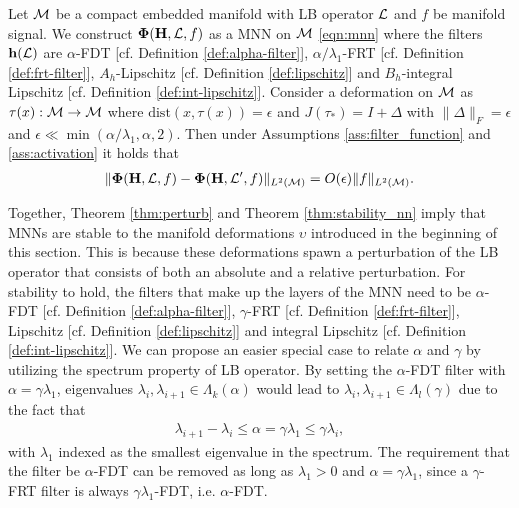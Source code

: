 \begin{theorem}
Let ${\mathcal M}$ be a compact embedded manifold with LB operator ${\mathcal L}$ and $f$ be manifold signal. We construct $\bm\Phi({\mathbf H},{\mathcal L},f)$ as a MNN on ${\mathcal M}$ \eqref{eqn:mnn} where the filters ${\mathbf h}({\mathcal L})$ are $\alpha$-FDT [cf. Definition \ref{def:alpha-filter}], $\alpha/\lambda_1$-FRT [cf. Definition \ref{def:frt-filter}], $A_h$-Lipschitz [cf. Definition \ref{def:lipschitz}] and $B_h$-integral Lipschitz [cf. Definition \ref{def:int-lipschitz}]. Consider a deformation on ${\mathcal M}$ as $\tau(x):{\mathcal M}\rightarrow {\ensuremath{\mathcal M}}$ where $\text{dist}(x,\tau(x))=\epsilon$ and $J(\tau_*)=I+\Delta$ with $\|\Delta\|_F=\epsilon$ and $\epsilon\ll \min(\alpha/\lambda_1,\alpha,2)$. Then under Assumptions \ref{ass:filter_function} and \ref{ass:activation} it holds that
\begin{align}
    \|\bm\Phi({\mathbf H},{\mathcal L},f)-\bm\Phi({\mathbf H},{\mathcal L}',f)\|_{L^2({\mathcal M})}=O(\epsilon)\|f\|_{L^2({\mathcal M})}.
\end{align}
\end{theorem}

Together, Theorem \ref{thm:perturb} and Theorem \ref{thm:stability_nn} imply that MNNs are stable to the manifold deformations $\upsilon$ introduced in the beginning of this section. This is because these deformations spawn a perturbation of the LB operator that consists of both an absolute and a relative perturbation. For stability to hold, the filters that make up the layers of the MNN need to be $\alpha$-FDT [cf. Definition \ref{def:alpha-filter}], $\gamma$-FRT [cf. Definition \ref{def:frt-filter}], Lipschitz [cf. Definition \ref{def:lipschitz}] and integral Lipschitz [cf. Definition \ref{def:int-lipschitz}]. We can propose an easier special case to relate $\alpha$ and $\gamma$ by utilizing the spectrum property of LB operator. By setting the $\alpha$-FDT filter with $\alpha = \gamma\lambda_1$, eigenvalues $\lambda_i,\lambda_{i+1}\in\Lambda_k(\alpha)$ would lead to $\lambda_i,\lambda_{i+1}\in\Lambda_l(\gamma)$ due to the fact that
\begin{align}
    \lambda_{i+1}-\lambda_i \leq \alpha=\gamma\lambda_1\leq \gamma \lambda_i,
\end{align}
with $\lambda_1$ indexed as the smallest eigenvalue in the spectrum. The requirement that the filter be $\alpha$-FDT can be removed as long as $\lambda_1>0$ and $\alpha=\gamma \lambda_1$, since a $\gamma$-FRT filter is always $\gamma\lambda_1$-FDT, i.e. $\alpha$-FDT.  

